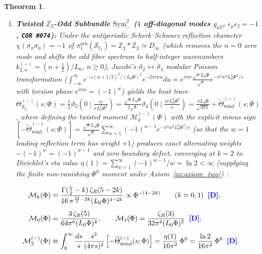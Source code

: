 \documentclass[11pt,a4paper]{article}
\newcommand{\catD}{\text{\textbf{\textcolor{blue!75!black}{[D]}}}}
\theoremstyle{definition}
\theoremstyle{plain}
\newtheorem{theorem}[axiom]{Theorem}
\theoremstyle{remark}
\begin{document}
\begin{theorem}
\begin{enumerate}[label=(\alph*)]
  \item \textbf{Twisted $\mathbb{Z}_2$-Odd Subbundle $\mathrm{Sym}^2_-$ ($4$ off-diagonal modes $g_{\mu 2}$, $\epsilon_\mu\epsilon_2 = -1$, \texttt{COR~\#074}):} Under the antiperiodic Scherk--Schwarz reflection character $\chi(\sigma_\pi\sigma_0) = -1$ of $\pi_1^{\mathrm{orb}}(\mathcal{S}_{t_2}) = \mathbb{Z}_2 * \mathbb{Z}_2 \simeq D_\infty$ (which removes the $n = 0$ zero mode and shifts the odd fiber spectrum to half-integer wavenumbers $k_{2,n}^{(-)} = (n + \frac{1}{2})/L_0$, $n \ge 0$), Jacobi's $\vartheta_2 \leftrightarrow \vartheta_4$ modular Poisson transformation ($\int_{-\infty}^\infty e^{-s(u+1/2)^2/(L_0\Phi)^2}e^{-2\pi i w u}du = e^{i\pi w}\frac{\sqrt{\pi}L_0\Phi}{\sqrt{s}}e^{-\pi^2 w^2 L_0^2\Phi^2/s}$ with torsion phase $e^{i\pi w} = (-1)^w$) yields the heat trace $\Theta_{\mathcal{S}_{t_2}}^{(-)}(s;\Phi) = \frac{1}{2}\vartheta_2(0\mid\frac{is}{\pi L_0^2\Phi^2}) = \frac{\sqrt{\pi}L_0\Phi}{2\sqrt{s}}\vartheta_4(0\mid\frac{i\pi L_0^2\Phi^2}{s}) = \frac{\pi L_0\Phi}{\sqrt{4\pi s}} + \widetilde{\Theta}_{\mathrm{wind}}^{(-)}(s;\Phi)$, where defining the twisted moment $\mathcal{M}_k^{(-)}(\Phi)$ with the explicit minus sign $[-\widetilde{\Theta}_{\mathrm{wind}}^{(-)}(s;\Phi)] = \frac{\sqrt{\pi}L_0\Phi}{\sqrt{s}}\sum_{w=1}^\infty (-1)^{w-1}e^{-\pi^2 w^2 L_0^2\Phi^2/s}$ (so that the $w = 1$ leading reflection term has weight $+1$) produces exact alternating weights $-(-1)^w = (-1)^{w-1}$ and zero boundary defect, converging at $k = 2$ to Dirichlet's eta value $\eta(1) = \sum_{w=1}^\infty (-1)^{w-1}/w = \ln 2 < \infty$ (supplying the finite non-vanishing $\Phi^0$ moment under Axiom~\ref{ax:axiom_two}) \catD:
\end{enumerate}
\begin{align}
\mathcal{M}_k(\Phi) &= \frac{\Gamma(\frac{5}{2} - k)\,\zeta_R(5 - 2k)}{16\,\pi^{\frac{13}{2}-2k}(L_0\Phi)^{4-2k}} \propto \Phi^{-(4-2k)} \qquad (k = 0, 1) \;\;\catD, \label{eq:c4_mellin_moments_01} \\[4pt]
\mathcal{M}_0(\Phi) &= \frac{3\,\zeta_R(5)}{64\pi^6(L_0\Phi)^4}, \qquad
\mathcal{M}_1(\Phi) = \frac{\zeta_R(3)}{32\pi^4(L_0\Phi)^2} \;\;\catD, \nonumber \\[4pt]
\mathcal{M}_2^{(-)}(\Phi) &\equiv \int_0^\infty\frac{ds}{s}\frac{s^2}{(4\pi s)^2}\left[-\widetilde{\Theta}_{\mathrm{wind}}^{(-)}(s;\Phi)\right] = \frac{\eta(1)}{16\pi^2}\,\Phi^0 = \frac{\ln 2}{16\pi^2}\,\Phi^0 \;\;\catD. \label{eq:c4_mellin_moments_values}
\end{align}

\end{theorem}
\end{document}
